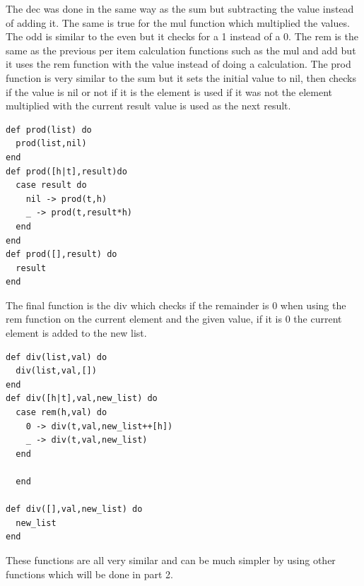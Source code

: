 \documentclass[a4paper,11pt]{article}
\begin{document}
The dec was done in the same way as the sum but subtracting the value instead of adding it. 
The same is true for the mul function which multiplied the values. 
The odd is similar to the even but it checks for a 1 instead of a 0. The rem is the same as the previous per item calculation functions such as the 
mul and add but it uses the rem function with the value instead of doing a calculation. 
The prod function is very similar to the sum but it sets the initial value to nil, then checks if the value is nil or not if it is the element is used if it was not the element multiplied with the current result value is used as the next result. 
\begin{verbatim}
def prod(list) do
  prod(list,nil)
end
def prod([h|t],result)do
  case result do
    nil -> prod(t,h)
    _ -> prod(t,result*h)
  end
end
def prod([],result) do
  result
end
\end{verbatim}
The final function is the div which checks if the remainder is 0 when using the rem function on the current element and the given value, if it is 0 the current element is added to the new list. 

\begin{verbatim}
def div(list,val) do
  div(list,val,[])
end
def div([h|t],val,new_list) do
  case rem(h,val) do
    0 -> div(t,val,new_list++[h])
    _ -> div(t,val,new_list)
  end

  end

def div([],val,new_list) do
  new_list
end
\end{verbatim}
These functions are all very similar and can be much simpler by using other functions which will be done in part 2. 
\end{document}
